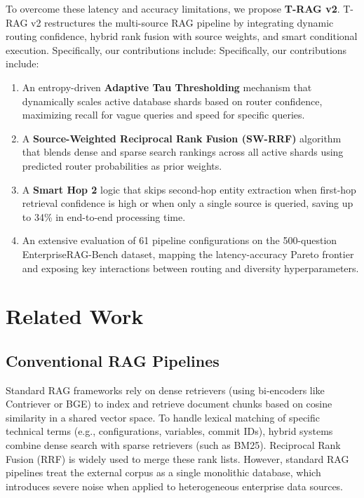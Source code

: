 \documentclass[conference]{IEEEtran}
\begin{document}
To overcome these latency and accuracy limitations, we propose \textbf{T-RAG v2}. T-RAG v2 restructures the multi-source RAG pipeline by integrating dynamic routing confidence, hybrid rank fusion with source weights, and smart conditional execution. Specifically, our contributions include:
Specifically, our contributions include:
\begin{enumerate}
    \item An entropy-driven \textbf{Adaptive Tau Thresholding} mechanism that dynamically scales active database shards based on router confidence, maximizing recall for vague queries and speed for specific queries.
    \item A \textbf{Source-Weighted Reciprocal Rank Fusion (SW-RRF)} algorithm that blends dense and sparse search rankings across all active shards using predicted router probabilities as prior weights.
    \item A \textbf{Smart Hop 2} logic that skips second-hop entity extraction when first-hop retrieval confidence is high or when only a single source is queried, saving up to 34\% in end-to-end processing time.
    \item An extensive evaluation of 61 pipeline configurations on the 500-question EnterpriseRAG-Bench dataset, mapping the latency-accuracy Pareto frontier and exposing key interactions between routing and diversity hyperparameters.
\end{enumerate}

\section{Related Work}
\subsection{Conventional RAG Pipelines}
Standard RAG frameworks rely on dense retrievers (using bi-encoders like Contriever or BGE) to index and retrieve document chunks based on cosine similarity in a shared vector space. To handle lexical matching of specific technical terms (e.g., configurations, variables, commit IDs), hybrid systems combine dense search with sparse retrievers (such as BM25). Reciprocal Rank Fusion (RRF) is widely used to merge these rank lists. However, standard RAG pipelines treat the external corpus as a single monolithic database, which introduces severe noise when applied to heterogeneous enterprise data sources.
\end{document}
